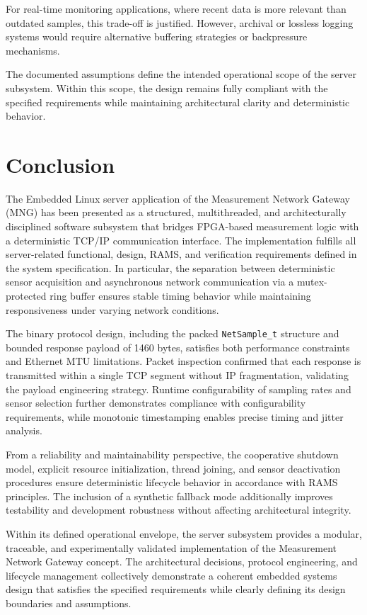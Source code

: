 For real-time monitoring applications, where recent data is more relevant than outdated samples, this trade-off is justified. However, archival or lossless logging systems would require alternative buffering strategies or backpressure mechanisms.

\bigskip

The documented assumptions define the intended operational scope of the server subsystem. Within this scope, the design remains fully compliant with the specified requirements while maintaining architectural clarity and deterministic behavior.

\section{Conclusion}

The Embedded Linux server application of the Measurement Network Gateway (MNG) has been presented as a structured, multithreaded, and architecturally disciplined software subsystem that bridges FPGA-based measurement logic with a deterministic TCP/IP communication interface. The implementation fulfills all server-related functional, design, RAMS, and verification requirements defined in the system specification. In particular, the separation between deterministic sensor acquisition and asynchronous network communication via a mutex-protected ring buffer ensures stable timing behavior while maintaining responsiveness under varying network conditions.

The binary protocol design, including the packed \texttt{NetSample\_t} structure and bounded response payload of 1460 bytes, satisfies both performance constraints and Ethernet MTU limitations. Packet inspection confirmed that each response is transmitted within a single TCP segment without IP fragmentation, validating the payload engineering strategy. Runtime configurability of sampling rates and sensor selection further demonstrates compliance with configurability requirements, while monotonic timestamping enables precise timing and jitter analysis.

From a reliability and maintainability perspective, the cooperative shutdown model, explicit resource initialization, thread joining, and sensor deactivation procedures ensure deterministic lifecycle behavior in accordance with RAMS principles. The inclusion of a synthetic fallback mode additionally improves testability and development robustness without affecting architectural integrity.

Within its defined operational envelope, the server subsystem provides a modular, traceable, and experimentally validated implementation of the Measurement Network Gateway concept. The architectural decisions, protocol engineering, and lifecycle management collectively demonstrate a coherent embedded systems design that satisfies the specified requirements while clearly defining its design boundaries and assumptions.

